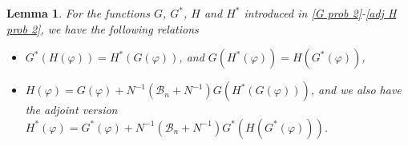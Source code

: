 \documentclass[10pt,a4paper]{amsart}
\numberwithin{equation}{section}
\newtheorem{lemma}[theorem]{Lemma}
\begin{document}
\begin{lemma}
\label{lem:aux relations} 
For the functions $G$, $G^{\ast }$, $H$ and $H^{\ast }$ introduced in 
\eqref{G prob 2}-\eqref{adj H prob 2}, we have the
following relations
\begin{itemize}
\item[(i)] $G^{\ast }(H(\varphi ))=H^{\ast }(G(\varphi ))$, and 
$G(H^{\ast }(\varphi ))=H(G^{\ast }(\varphi ))$,

\item[(ii)] $H(\varphi )=G(\varphi )+N^{-1}(\mathcal{B}_n+N^{-1})G(H^{\ast
}(G(\varphi )))$, and we also have the adjoint version $H^{\ast }(\varphi
)=G^{\ast }(\varphi )+N^{-1}(\mathcal{B}_n+N^{-1})G^{\ast }(H(G^{\ast
}(\varphi )))$.
\end{itemize}
\end{lemma}
\end{document}

